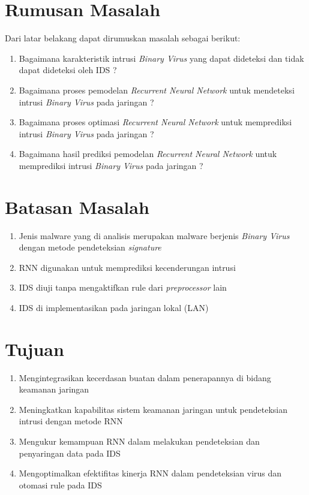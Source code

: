 \documentclass{report}
\begin{document}
\section{Rumusan Masalah}
Dari latar belakang dapat dirumuskan masalah sebagai berikut:
\begin{enumerate}
    \item Bagaimana karakteristik intrusi \textit{Binary Virus} yang dapat dideteksi dan tidak dapat dideteksi oleh IDS ?
    \item Bagaimana proses pemodelan \textit{Recurrent Neural Network} untuk mendeteksi intrusi \textit{Binary Virus} pada jaringan ?
    \item Bagaimana proses optimasi \textit{Recurrent Neural Network} untuk memprediksi intrusi \textit{Binary Virus} pada jaringan ?
    \item Bagaimana hasil prediksi pemodelan \textit{Recurrent Neural Network} untuk memprediksi intrusi \textit{Binary Virus} pada jaringan ?
\end{enumerate}
\section{Batasan Masalah}
\begin{enumerate}
    \item Jenis malware yang di analisis merupakan malware berjenis \textit{Binary Virus} dengan metode pendeteksian \textit{signature}
    \item RNN digunakan untuk memprediksi kecenderungan intrusi
    \item IDS diuji tanpa mengaktifkan rule dari \textit{preprocessor} lain
    \item IDS di implementasikan pada jaringan lokal (LAN)
\end{enumerate}
\section{Tujuan}
\begin{enumerate}
    \item Mengintegrasikan kecerdasan buatan dalam penerapannya di bidang keamanan jaringan
    \item Meningkatkan kapabilitas sistem keamanan jaringan untuk pendeteksian intrusi dengan metode RNN
    \item Mengukur kemampuan RNN dalam melakukan pendeteksian dan penyaringan data pada IDS
    \item Mengoptimalkan efektifitas kinerja RNN dalam pendeteksian virus dan otomasi rule pada IDS
\end{enumerate}
\end{document}
